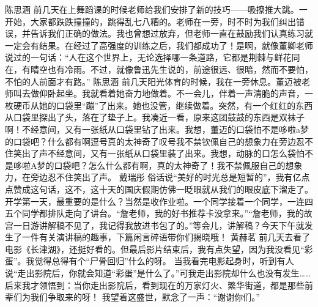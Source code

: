 {}\markdownRendererInterblockSeparator
{}陈思涵\markdownRendererInterblockSeparator
{}前几天在上舞蹈课的时候老师给我们安排了新的技巧——吸撩推大跳。一开始，大家都跌跌撞撞的，跳得乱七八糟的。老师在一旁，时不时为我们纠出错误，并告诉我们正确的做法。我也曾想过放弃，但老师一直在鼓励我们认真练习就一定会有结果。在经过了高强度的训练之后，我们都成功了！是啊，就像董卿老师说过的一句话：“人在这个世界上，无论选择哪一条道路，它都是荆棘与鲜花同在，有晴空也有冷雨。不过，就像鲁迅先生说的，前途很远、很暗，然而不要怕，不怕的人前面才有路。”\markdownRendererInterblockSeparator
{}\markdownRendererInterblockSeparator
{}陈思涵\markdownRendererInterblockSeparator
{}前几天阳光体育的时候，我在一旁休息。董迈被老师叫去做仰卧起坐。我就看着她奋力地做着。不一会儿，伴着一声清脆的声音，一枚硬币从她的口袋里“蹦”了出来。她也没管，继续做着。突然，有一个红红的东西从口袋里探出了头，落在了垫子上。我凑近一看，原来这团鼓鼓的东西是双袜子啊！不经意间，又有一张纸从口袋里钻了出来。我想，董迈的口袋怕不是哆啦a梦的口袋吧？什么都有啊逗号真的太神奇了叹号我不禁钦佩自己的想象力在旁边忍不住笑出了声不经意间，又有一张纸从口袋里装了出来。我想，动脉的口怎么袋怕不是哆啦A梦的口袋吧？怎么什么都有啊，真的太神奇了！我不禁佩服自己的想象力，在旁边忍不住笑出了声。\markdownRendererInterblockSeparator
{}\markdownRendererInterblockSeparator
{}戴瑞彤\markdownRendererInterblockSeparator
{}俗话说“美好的时光总是短暂的”，我有亿点点赞成这句话，这不，这十天的国庆假期仿佛一眨眼就从我们的眼皮底下溜走了。\markdownRendererInterblockSeparator
{}开学第一天，最重要的是什么？当然是收作业啦。一个同学接着一个同学，一连四五个同学都排队走向了讲台。“詹老师，我的好书推荐卡没拿来。”“詹老师，我的故宫一日游讲解稿不见了，我记得我放进书包了的。”等会儿，讲解稿？今天下午就发生了一件有关演讲稿的趣事，下篇闲言碎语带你们揭晓哦！ \markdownRendererInterblockSeparator
{}\markdownRendererInterblockSeparator
{}黄赫茗\markdownRendererInterblockSeparator
{}前几天去看了电影《长津湖》，还挺好看的。但最后影片结束后，我有点失望，因为我没看见“彩蛋”。我觉得总得有个“尸骨回归”什么的呀。\markdownRendererInterblockSeparator
{}当我看完电影起身时，听到有人说“走出影院后，你就会知道“彩蛋”是什么了。”可我走出影院却什么也没有发生……\markdownRendererInterblockSeparator
{}后来我才领悟到：当你走出影院后，看到现在的万家灯火、繁华街道，都是那些前辈们为我们争取来的呀！\markdownRendererInterblockSeparator
{}我望着这盛世，默念了一声：“谢谢你们。”\markdownRendererInterblockSeparator
{}\markdownRendererInterblockSeparator
